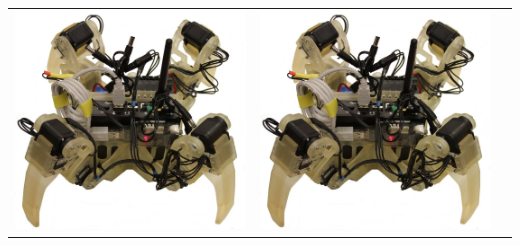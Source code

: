 \documentclass[portrait,final]{baposter}
\begin{document}
\begin{poster}
{\begin{multicols}{3}
      \begin{tabular}{ccc}
        \includegraphics[width=.9\linewidth]{robot_whitebg.jpg}
        &
        \includegraphics[width=.9\linewidth]{robot_whitebg.jpg}
        &

\end{tabular}
\end{multicols}}
\end{poster}
\end{document}

